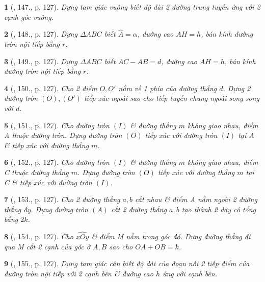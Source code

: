 \documentclass{article}
\newtheorem{baitoan}{}
\begin{document}
\begin{baitoan}[\cite{Binh_Toan_9_tap_1}, 147., p. 127]
	Dựng tam giác vuông biết độ dài 2 đường trung tuyến ứng với 2 cạnh góc vuông.
\end{baitoan}

\begin{baitoan}[\cite{Binh_Toan_9_tap_1}, 148., p. 127]
	Dựng $\Delta ABC$ biết $\widehat{A} = \alpha$, đường cao $AH = h$, bán kính đường tròn nội tiếp bằng $r$.
\end{baitoan}

\begin{baitoan}[\cite{Binh_Toan_9_tap_1}, 149., p. 127]
	Dựng $\Delta ABC$ biết $AC - AB = d$, đường cao $AH = h$, bán kính đường tròn nội tiếp bằng $r$.
\end{baitoan}

\begin{baitoan}[\cite{Binh_Toan_9_tap_1}, 150., p. 127]
	Cho 2 điểm $O,O'$ nằm về 1 phía của đường thẳng $d$. Dựng 2 đường tròn $(O),(O')$ tiếp xúc ngoài sao cho tiếp tuyến chung ngoài song song với $d$.
\end{baitoan}

\begin{baitoan}[\cite{Binh_Toan_9_tap_1}, 151., p. 127]
	Cho đường tròn $(I)$ \& đường thẳng $m$ không giao nhau, điểm A thuộc đường tròn. Dựng đường tròn $(O)$ tiếp xúc với đường tròn $(I)$ tại $A$ \& tiếp xúc với đường thẳng $m$.
\end{baitoan}

\begin{baitoan}[\cite{Binh_Toan_9_tap_1}, 152., p. 127]
	Cho đường tròn $(I)$ \& đường thẳng $m$ không giao nhau, điểm C thuộc đường thẳng $m$. Dựng đường tròn $(O)$ tiếp xúc với đường thẳng $m$ tại C \& tiếp xúc với đường tròn $(I)$.
\end{baitoan}

\begin{baitoan}[\cite{Binh_Toan_9_tap_1}, 153., p. 127]
	Cho 2 đường thẳng $a,b$ cắt nhau \& điểm A nằm ngoài 2 đường thẳng ấy. Dựng đường tròn $(A)$ cắt 2 đường thẳng $a,b$ tạo thành 2 dây có tổng bằng $2k$.
\end{baitoan}

\begin{baitoan}[\cite{Binh_Toan_9_tap_1}, 154., p. 127]
	Cho $\widehat{xOy}$ \& điểm M nằm trong góc đó. Dựng đường thẳng đi qua M cắt 2 cạnh của góc ở $A,B$ sao cho $OA + OB = k$.
\end{baitoan}

\begin{baitoan}[\cite{Binh_Toan_9_tap_1}, 155., p. 127]
	Dựng tam giác cân biết độ dài của đoạn nối 2 tiếp điểm của đường tròn nội tiếp với 2 cạnh bên \& đường cao $h$ ứng với cạnh bên.
\end{baitoan}
\end{document}
